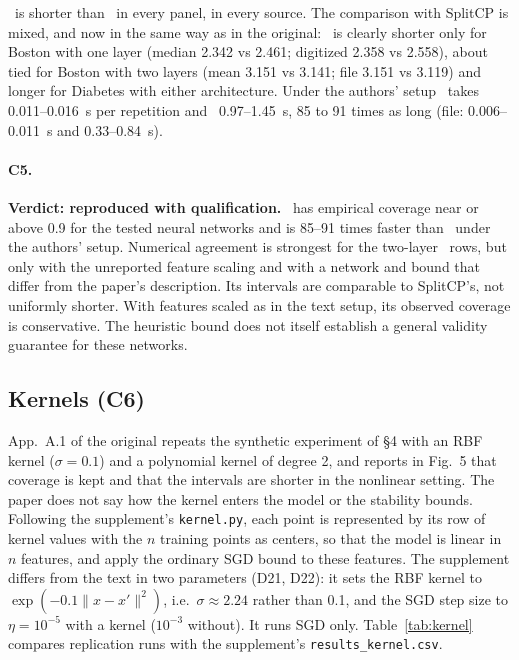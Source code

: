 \LOO\ is shorter than \RO\ in every panel, in every source. The comparison with SplitCP is mixed, and now in the same
way as in the original: \LOO\ is clearly shorter only for Boston with one layer (median 2.342 vs 2.461; digitized 2.358
vs 2.558), about tied for Boston with two layers (mean 3.151 vs 3.141; file 3.151 vs 3.119) and longer for Diabetes
with either architecture. Under the authors' setup \LOO\ takes 0.011--0.016~s per repetition and \RO\ 0.97--1.45~s,
85 to 91 times as long (file: 0.006--0.011~s and 0.33--0.84~s).

\paragraph{C5.} \textbf{Verdict: reproduced with qualification.} \LOO\ has empirical coverage near or above 0.9 for the tested neural networks and is 85--91 times faster than \RO\ under the authors' setup. Numerical agreement is strongest for the two-layer \LOO\ rows, but only with the unreported feature
scaling and with a network and bound that differ from the paper's description. Its intervals are comparable to
SplitCP's, not uniformly shorter. With features scaled as in the text setup, its observed coverage is conservative. The heuristic bound does not itself establish a general validity guarantee for these networks.

\subsection{Kernels (C6)}
\label{sec:kernel}

App.~A.1 of the original repeats the synthetic experiment of §4 with an RBF kernel ($\sigma=0.1$) and a polynomial
kernel of degree 2, and reports in Fig.~5 that coverage is kept and that the intervals are shorter in the nonlinear
setting. The paper does not say how the kernel enters the model or the stability bounds. Following the supplement's
\texttt{kernel.py}, each point is represented by its row of kernel values with the $n$ training points as centers, so
that the model is linear in $n$ features, and apply the ordinary SGD bound to these features. The supplement differs
from the text in two parameters (D21, D22): it sets the RBF kernel to $\exp(-0.1\|x-x'\|^2)$, i.e.\ $\sigma\approx2.24$
rather than 0.1, and the SGD step size to $\eta=10^{-5}$ with a kernel ($10^{-3}$ without). It runs SGD only. Table~\ref{tab:kernel}
compares replication runs with the supplement's \texttt{results\_kernel.csv}.

